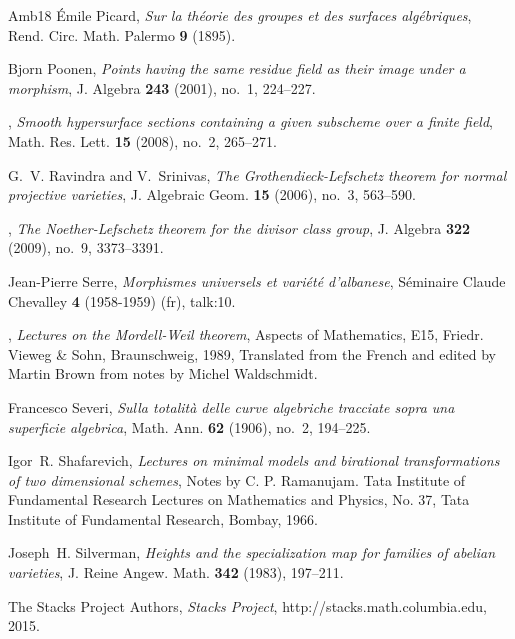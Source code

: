 \documentclass{amsart}
\theoremstyle{definition}
\theoremstyle{remark}
\begin{document}
\begin{thebibliography}{{Amb}18}
\'Emile Picard, \emph{Sur la th\'eorie des groupes et des surfaces
  alg\'ebriques}, Rend. Circ. Math. Palermo \textbf{9} (1895).

Bjorn Poonen, \emph{Points having the same residue field as their image under a
  morphism}, J. Algebra \textbf{243} (2001), no.~1, 224--227. 

\bysame, \emph{Smooth hypersurface sections containing a given subscheme over a
  finite field}, Math. Res. Lett. \textbf{15} (2008), no.~2, 265--271.

G.~V. Ravindra and V.~Srinivas, \emph{The {G}rothendieck-{L}efschetz theorem
  for normal projective varieties}, J. Algebraic Geom. \textbf{15} (2006),
  no.~3, 563--590. 

\bysame, \emph{The {N}oether-{L}efschetz theorem for the divisor class group},
  J. Algebra \textbf{322} (2009), no.~9, 3373--3391. 

Jean-Pierre Serre, \emph{Morphismes universels et vari\'et\'e d'albanese},
  S\'eminaire Claude Chevalley \textbf{4} (1958-1959) (fr), talk:10.

\bysame, \emph{Lectures on the {M}ordell-{W}eil theorem}, Aspects of
  Mathematics, E15, Friedr. Vieweg \& Sohn, Braunschweig, 1989, Translated from
  the French and edited by Martin Brown from notes by Michel Waldschmidt.

Francesco Severi, \emph{Sulla totalit\`a delle curve algebriche tracciate sopra
  una superficie algebrica}, Math. Ann. \textbf{62} (1906), no.~2, 194--225.

Igor~R. Shafarevich, \emph{Lectures on minimal models and birational
  transformations of two dimensional schemes}, Notes by C. P. Ramanujam. Tata
  Institute of Fundamental Research Lectures on Mathematics and Physics, No.
  37, Tata Institute of Fundamental Research, Bombay, 1966. 

Joseph~H. Silverman, \emph{Heights and the specialization map for families of
  abelian varieties}, J. Reine Angew. Math. \textbf{342} (1983), 197--211.

The {Stacks Project Authors}, \emph{{S}tacks {P}roject},
  http://stacks.math.columbia.edu, 2015.


\end{thebibliography}
\end{document}
